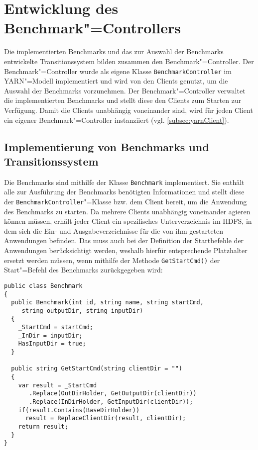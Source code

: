\section{Entwicklung des Benchmark"=Controllers}
\label{sec:benchmarkController}

Die implementierten Benchmarks und das zur Auswahl der Benchmarks entwickelte Transitionssystem bilden zusammen den Benchmark"=Controller.
Der Benchmark"=Controller wurde als eigene Klasse \texttt{BenchmarkController} im YARN"=Modell implementiert und wird von den Clients genutzt, um die Auswahl der Benchmarks vorzunehmen.
Der Benchmark"=Controller verwaltet die implementierten Benchmarks und stellt diese den Clients zum Starten zur Verfügung.
Damit die Clients unabhängig voneinander sind, wird für jeden Client ein eigener Benchmark"=Controller instanziiert (vgl. \cref{subsec:yarnClient}).

\subsection{Implementierung von Benchmarks und Transitionssystem}
\label{subsec:appImplementation}

Die Benchmarks sind mithilfe der Klasse \texttt{Benchmark} implementiert.
Sie enthält alle zur Ausführung der Benchmarks benötigten Informationen und stellt diese der \texttt{BenchmarkController}"=Klasse bzw. dem Client bereit, um die Anwendung des Benchmarks zu starten.
Da mehrere Clients unabhängig voneinander agieren können müssen, erhält jeder Client ein spezifisches Unterverzeichnis im HDFS, in dem sich die Ein- und Ausgabeverzeichnisse für die von ihm gestarteten Anwendungen befinden.
Das muss auch bei der Definition der Startbefehle der Anwendungen berücksichtigt werden, weshalb hierfür entsprechende Platzhalter ersetzt werden müssen, wenn mithilfe der Methode \texttt{GetStartCmd()} der Start"=Befehl des Benchmarks zurückgegeben wird:

\begin{lstlisting}[label=lst:benchmarkClass,style=cs,
caption={[Wesentliche Methoden der Klasse Benchmark]
    Wesentliche Methoden der Klasse \texttt{Benchmark}}]
public class Benchmark
{
  public Benchmark(int id, string name, string startCmd,
     string outputDir, string inputDir)
  {
    _StartCmd = startCmd;
    _InDir = inputDir;
    HasInputDir = true;
  }
  
  public string GetStartCmd(string clientDir = "")
  {
    var result = _StartCmd
       .Replace(OutDirHolder, GetOutputDir(clientDir))
       .Replace(InDirHolder, GetInputDir(clientDir));
    if(result.Contains(BaseDirHolder))
      result = ReplaceClientDir(result, clientDir);
    return result;
  }
}
\end{lstlisting}

